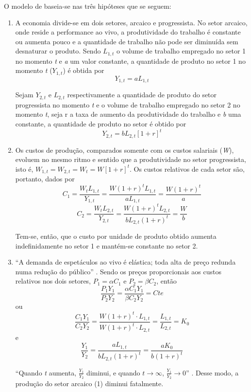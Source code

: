 \documentclass[a4paper, 12pt, openright, oneside, german, french, english, brazil]{abntex2}
\begin{document}
	O modelo de  baseia-se nas três hipóteses que se seguem:
	
	\begin{enumerate}
		\item A economia divide-se em dois setores, arcaico e progressista. No setor arcaico, onde reside a performance ao vivo, a produtividade do trabalho é constante ou aumenta pouco e a quantidade de trabalho não pode ser diminuída sem desnaturar o produto. Sendo $L_{1,t}$ o volume de trabalho empregado no setor 1 no momento \textit{t} e \textit{a} um valor constante, a quantidade de produto no setor 1 no momento \textit{t} ($Y_{1,t}$) é obtida por $$Y_{1,t} = aL_{1,t}$$
		
		Sejam $Y_{2,t}$ e $L_{2,t}$ respectivamente a quantidade de produto do setor progressista no momento \textit{t} e o volume de trabalho empregado no setor 2 no momento \textit{t}, seja r a taxa de aumento da produtividade do trabalho e \textit{b} uma constante, a quantidade de produto no setor é obtido por $$Y_{2,t} = bL_{2,t}[1+r]^t $$
		
		\item Os custos de produção, comparados somente com os custos salariais (\textit{W}), evoluem no mesmo ritmo e sentido que a produtividade no setor progressista, isto é, $W_{1,t} = W_{2,t} = W_t = W[1+r]^t$. Os custos relativos de cada setor são, portanto, dados por
		$$C_1 = \frac{W_tL_{1,t}}{Y_{1,t}} = \frac{W(1+r)^tL_{1,t}}{aL_{1,t}} = \frac{W(1+r)^t}{a}$$
		$$C_2 = \frac{W_tL_{2,t}}{Y_{2,t}} = \frac{W(1+r)^tL_{2,t}}{bL_{2,t}(1+r)^t} = \frac{W}{b}$$
		
		Tem-se, então, que o custo por unidade de produto obtido aumenta indefinidamente no setor 1 e mantém-se constante no setor 2.
		
		\item ``A demanda de espetáculos ao vivo é elástica; toda alta de preço redunda numa redução do público'' \cite[p. 56]{benhamou2007economia}. Sendo os preços proporcionais aos custos relativos nos dois setores, $P_1 = \alpha C_1$ e $P_2 = \beta C_2$, então
		$$\frac{P_1Y_1}{P_2Y_2} = \frac{\alpha C_1Y_1}{\beta C_2Y_2} = Cte$$ ou
		$$\frac{C_1Y_1}{C_2Y_2} = \frac{W(1+r)^t \cdot L_{1,t}}{W(1+r)^t \cdot L_{2,t}} = \frac{L_{1,t}}{L_{2,t}} = K_0$$ e
		$$\frac{Y_1}{Y_2} = \frac{aL_{1,t}}{bL_{2,t}(1+r)^t} = \frac{aK_0}{b(1+r)^t}$$
		
		``Quando \textit{t} aumenta, $\frac{Y_1}{Y_2}$ diminui, e quando $t \rightarrow \infty$, $\frac{Y_1}{Y_2} \rightarrow 0$'' \cite[p. 57]{benhamou2007economia}. Desse modo, a produção do setor arcaico (1) diminui fatalmente.
	\end{enumerate}
	
\end{document}
